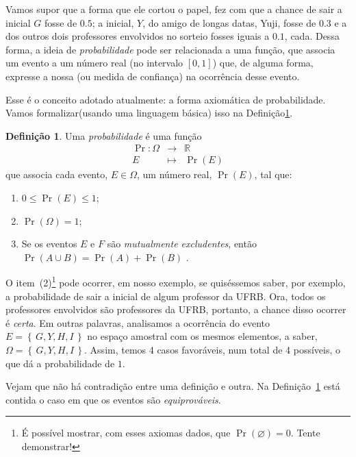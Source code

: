 \documentclass[12pt]{article}
\theoremstyle{definition}
\newtheorem{definicao}{Definição}
\begin{document}
Vamos supor que a forma que ele cortou o papel, fez com que a chance de 
sair a inicial $G$ fosse de $0.5$; a inicial, $Y$, do amigo de longas datas,
Yuji, fosse de $0.3$ e a dos outros dois professores envolvidos no sorteio 
fosses iguais a $0.1$, cada.
Dessa forma, a ideia de \textit{probabilidade} pode ser relacionada a uma 
função, que associa um evento a um número real (no intervalo $[0, 1]$) que, de
alguma forma, expresse a nossa  (ou medida de confiança) na ocorrência
desse evento.

Esse é o conceito adotado atualmente: a forma axiomática de probabilidade.
Vamos formalizar\newline (usando uma linguagem básica) isso na Definição\ref{def:prob}.

\begin{definicao}\label{def:prob}
Uma \textit{probabilidade} é uma função 
\[
  \begin{array}{rcc}
   \Pr \colon \Omega & \longrightarrow & \mathbb{R}\\
		 E                 & \mapsto     & \Pr{(E)}
		\end{array}
\]
que associa cada evento, $E\in\Omega$, um número real, $\Pr{(E)}$, tal que:
\begin{enumerate}[(1)]
	\item $ 0 \leq \Pr{(E)} \leq 1 $;
	\item $ \Pr{(\Omega)} = 1 $;
	\item Se os eventos $ E $ e $ F $ são \textit{mutualmente excludentes}, então
	$ \Pr{(A \cup B)} = \Pr{(A)} + \Pr{(B)}$ .
\end{enumerate}
\end{definicao}

O item~(2)\footnote{É possível mostrar, com esses axiomas dados, que 
$\Pr{(\varnothing)} = 0$. Tente demonstrar!} pode ocorrer, em nosso exemplo, se 
quiséssemos saber, por exemplo, a probabilidade de sair a inicial de algum 
professor da UFRB. 
Ora, todos os professores envolvidos são professores da UFRB, portanto, a chance
disso ocorrer é \textit{certa}.
Em outras palavras, analisamos a ocorrência do evento 
$ E = \left\{\,G, Y, H, I\,\right\} $ no espaço amostral com os mesmos elementos,
a saber, $ \Omega = \left\{\,G, Y, H, I\,\right\} $.
Assim, temos 4 casos favoráveis, num total de 4 possíveis, o que dá a 
probabilidade de $1$.

Vejam que não há contradição entre uma definição e outra.
Na Definição~\ref{def:prob} está contida o caso em que os eventos são 
\textit{equiprováveis}.
\end{document}
